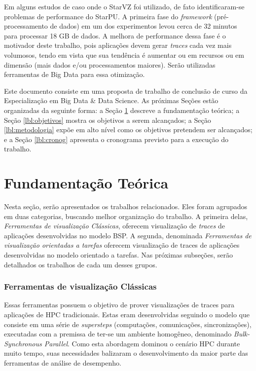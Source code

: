 \documentclass[prop-esp]{iiufrgs}
\begin{document}
Em alguns estudos de caso onde o StarVZ foi utilizado, de fato identificaram-se problemas de performance do StarPU. A primeira fase do \emph{framework} (pré-processamento de dados) em um dos experimentos levou cerca de 32 minutos para processar 18 GB de dados. A melhora de performance dessa fase é o motivador deste trabalho, pois aplicações devem gerar \emph{traces} cada vez mais volumosos, tendo em vista que sua tendência é aumentar ou em recursos ou em dimensão (mais dados e/ou processamentos maiores). Serão utilizadas ferramentas de Big Data para essa otimização.

Este documento consiste em uma proposta de trabalho de conclusão de curso da Especialização em Big Data \& Data Science. As próximas Seções estão organizadas da seguinte forma: a Seção \ref{lbl:fundamentacao} descreve a fundamentação teórica; a Seção \ref{lbl:objetivos} mostra os objetivos a serem alcançados; a Seção \ref{lbl:metodologia} expõe em alto nível como os objetivos pretendem ser alcançados; e a Seção \ref{lbl:cronog} apresenta o cronograma previsto para a execução do trabalho.


%
\chapter{Fundamentação Teórica} \label{lbl:fundamentacao}

Nesta seção, serão apresentados os trabalhos relacionados. Eles foram agrupados em duas categorias, buscando melhor organização do trabalho. A primeira delas, \emph{
Ferramentas de visualização Clássicas}, oferecem visualização de \emph{traces} de aplicações desenvolvidas no modelo BSP. A segunda, denominada \emph{Ferramentas de visualização orientadas a tarefas} oferecem visualização de traces de aplicações desenvolvidas no modelo orientado a tarefas. Nas próximas subseções, serão detalhados os trabalhos de cada um desses grupos.

\subsection*{Ferramentas de visualização Clássicas}

Essas ferramentas possuem o objetivo de prover visualizações de traces para aplicações de HPC tradicionais. Estas eram desenvolvidas
seguindo o modelo que consiste em uma série de \emph{supersteps} (computações, comunicações, sincronizações), executadas com a premissa de ter-se um ambiente homogêneo, denominado \emph{Bulk-Synchronous Parallel}. Como esta abordagem  dominou o cenário HPC durante muito tempo, suas necessidades
balizaram o desenvolvimento da maior parte das ferramentas de análise de desempenho.
\end{document}
